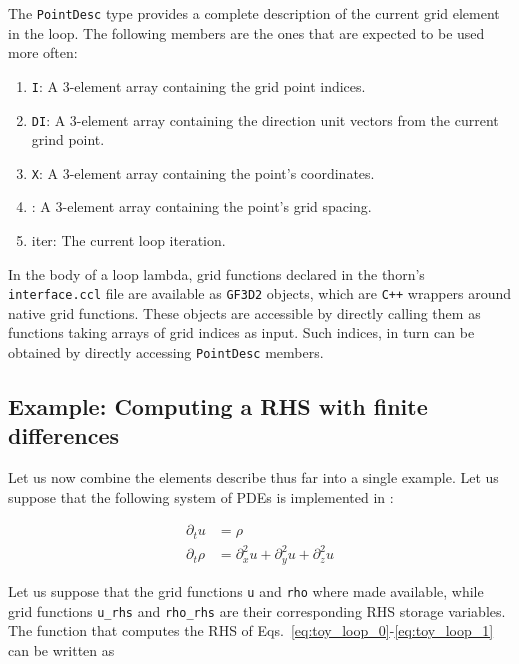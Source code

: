 The \texttt{PointDesc} type provides a complete description of the current grid element in the loop. The following members are the ones that are expected to be used more often:
%
\begin{enumerate}
  \item \texttt{I}: A 3-element array containing the grid point indices.
  \item \texttt{DI}: A 3-element array containing the direction unit vectors from the current grind point.
  \item \texttt{X}: A 3-element array containing the point's coordinates.
  \item {}: A 3-element array containing the point's grid spacing.
  \item {iter}: The current loop iteration.
\end{enumerate}

In the body of a loop lambda, grid functions declared in the thorn's \texttt{interface.ccl} file are available as \texttt{GF3D2} objects, which are \texttt{C++} wrappers around native \Cactus\space grid functions. These objects are accessible by directly calling them as functions taking arrays of grid indices as input. Such indices, in turn can be obtained by directly accessing \texttt{PointDesc} members.

\subsection{Example: Computing a RHS with finite differences}

Let us now combine the elements describe thus far into a single example. Let us suppose that the following system of PDEs is implemented in \Cactus:

\begin{align}
  \partial_t u & = \rho \label{eq:toy_loop_0}\\
  \partial_t \rho & = \partial_x^2 u + \partial_y^2 u + \partial_z^2 u \label{eq:toy_loop_1}
\end{align}

Let us suppose that the grid functions \texttt{u} and \texttt{rho} where made available, while grid functions \texttt{u\_rhs} and \texttt{rho\_rhs} are their corresponding RHS storage variables. The function that computes the RHS of Eqs.~\eqref{eq:toy_loop_0}-\eqref{eq:toy_loop_1} can be written as


